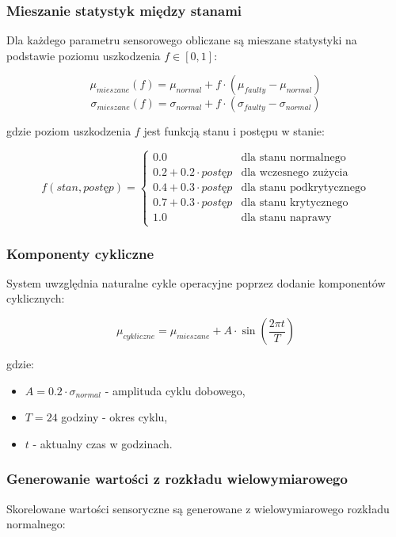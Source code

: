 \subsubsection{Mieszanie statystyk między stanami}

Dla każdego parametru sensorowego obliczane są mieszane statystyki na podstawie poziomu uszkodzenia $f \in [0, 1]$:

$$\mu_{mieszane}(f) = \mu_{normal} + f \cdot (\mu_{faulty} - \mu_{normal})$$
$$\sigma_{mieszane}(f) = \sigma_{normal} + f \cdot (\sigma_{faulty} - \sigma_{normal})$$

gdzie poziom uszkodzenia $f$ jest funkcją stanu i postępu w stanie:

$$f(stan, postęp) = \begin{cases}
0.0 & \text{dla stanu normalnego} \\
0.2 + 0.2 \cdot postęp & \text{dla wczesnego zużycia} \\
0.4 + 0.3 \cdot postęp & \text{dla stanu podkrytycznego} \\
0.7 + 0.3 \cdot postęp & \text{dla stanu krytycznego} \\
1.0 & \text{dla stanu naprawy}
\end{cases}$$

\subsubsection{Komponenty cykliczne}

System uwzględnia naturalne cykle operacyjne poprzez dodanie komponentów cyklicznych:

$$\mu_{cykliczne} = \mu_{mieszane} + A \cdot \sin\left(\frac{2\pi t}{T}\right)$$

gdzie:
\begin{itemize}
    \item $A = 0.2 \cdot \sigma_{normal}$ - amplituda cyklu dobowego,
    \item $T = 24$ godziny - okres cyklu,
    \item $t$ - aktualny czas w godzinach.
\end{itemize}

\subsubsection{Generowanie wartości z rozkładu wielowymiarowego}

Skorelowane wartości sensoryczne są generowane z wielowymiarowego rozkładu normalnego:


